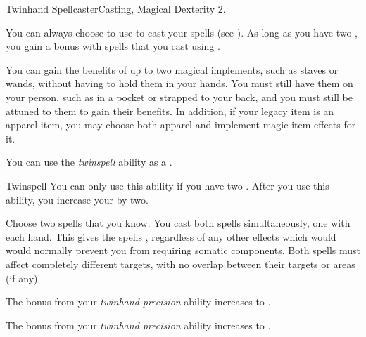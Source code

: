     \begin{feat}{Twinhand Spellcaster}{Casting, Magical}
        \featpre Dexterity 2.

         You can always choose to use  to cast your spells (see ).
        As long as you have two , you gain a   bonus with spells that you cast using .

         You can gain the benefits of up to two magical implements, such as staves or wands, without having to hold them in your hands.
        You must still have them on your person, such as in a pocket or strapped to your back, and you must still be attuned to them to gain their benefits.
        In addition, if your legacy item is an apparel item, you may choose both apparel and implement magic item effects for it.

         You can use the \textit{twinspell} ability as a .
        \begin{activeability}{Twinspell}
            \rankline
            You can only use this ability if you have two .
            After you use this ability, you increase your  by two.

            Choose two spells that you know.
            You cast both spells simultaneously, one with each hand.
            This gives the spells , regardless of any other effects which would would normally prevent you from requiring somatic components.
            Both spells must affect completely different targets, with no overlap between their targets or areas (if any).
        \end{activeability}

         The bonus from your \textit{twinhand precision} ability increases to .

         The bonus from your \textit{twinhand precision} ability increases to .
    \end{feat}

